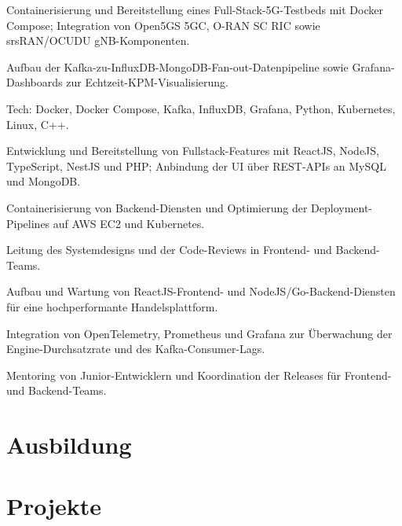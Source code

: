 \documentclass[10pt,a4paper]{resume}
\begin{document}
\bullets
  \item Containerisierung und Bereitstellung eines Full-Stack-5G-Testbeds mit Docker Compose; Integration von Open5GS 5GC, O-RAN SC RIC sowie srsRAN/OCUDU gNB-Komponenten.
  \item Aufbau der Kafka-zu-InfluxDB-MongoDB-Fan-out-Datenpipeline sowie Grafana-Dashboards zur Echtzeit-KPM-Visualisierung.
  \item Tech: Docker, Docker Compose, Kafka, InfluxDB, Grafana, Python, Kubernetes, Linux, C++.
\bulletsend
\vspace{1.5pt}
\bullets
  \item Entwicklung und Bereitstellung von Fullstack-Features mit ReactJS, NodeJS, TypeScript, NestJS und PHP; Anbindung der UI über REST-APIs an MySQL und MongoDB.
  \item Containerisierung von Backend-Diensten und Optimierung der Deployment-Pipelines auf AWS EC2 und Kubernetes.
  \item Leitung des Systemdesigns und der Code-Reviews in Frontend- und Backend-Teams.
\bulletsend
\vspace{1.5pt}
\bullets
  \item Aufbau und Wartung von ReactJS-Frontend- und NodeJS/Go-Backend-Diensten für eine hochperformante Handelsplattform.
  \item Integration von OpenTelemetry, Prometheus und Grafana zur Überwachung der Engine-Durchsatzrate und des Kafka-Consumer-Lags.
  \item Mentoring von Junior-Entwicklern und Koordination der Releases für Frontend- und Backend-Teams.
\bulletsend
\vspace{1.5pt}

\section{Ausbildung}

\vspace{2pt}

\section{Projekte}
\end{document}
